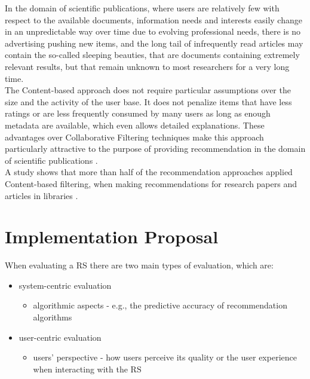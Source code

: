 \documentclass[\myFontSize,oneside,english,hidelinks,a4paper]{article}
\begin{document}
%
%
%
In the domain of scientific publications, where users are relatively few with respect to the available documents, information needs and interests easily change in an unpredictable way over time due to evolving professional needs, there is no advertising pushing new items, and the long tail of infrequently read articles may contain the so-called sleeping beauties, that are documents containing extremely relevant results, but that remain unknown to most researchers for a very long time. \\
The Content-based approach does not require particular assumptions over the size and the activity of the user base. It does not penalize items that have less ratings or are less frequently consumed by many users as long as enough metadata are available, which even allows detailed explanations. These advantages over Collaborative Filtering techniques make this approach particularly attractive to the purpose of providing recommendation in the domain of scientific publications \cite{De_Nart201484}. \\
%
A study shows that more than half of the recommendation approaches applied Content-based filtering, when making recommendations for research papers and articles in libraries \cite{Beel2016305}. \\
%







\clearpage
\section{Implementation Proposal}
When evaluating a RS there are two main types of evaluation, which are:
\begin{itemize}
\item system-centric evaluation
	\begin{itemize}
	\item algorithmic aspects - e.g., the predictive accuracy of recommendation algorithms
	\end{itemize}

\item user-centric evaluation
	\begin{itemize}
	\item users' perspective - how users perceive its quality or the user experience when interacting with the RS
	\end{itemize}

\end{itemize}
\end{document}
